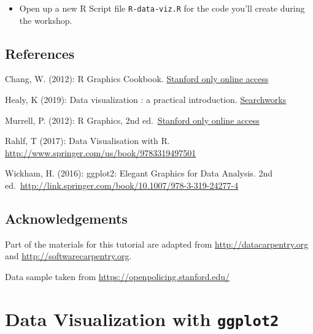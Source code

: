 \documentclass[]{book}
\providecommand{\tightlist}{%
  \setlength{\itemsep}{0pt}\setlength{\parskip}{0pt}}
\begin{document}
\begin{itemize}
\tightlist
\item
  Open up a new R Script file \texttt{R-data-viz.R} for the code you'll create during the workshop.
\end{itemize}

\hypertarget{references}{%
\section*{References}\label{references}}

Chang, W. (2012): R Graphics Cookbook. \href{https://stanford.idm.oclc.org/login?url=http://proquest.safaribooksonline.com/?uiCode=stanford\&xmlId=9781449363086}{Stanford only online access}

Healy, K (2019): Data visualization : a practical introduction. \href{https://searchworks.stanford.edu/view/12684817}{Searchworks}

Murrell, P. (2012): R Graphics, 2nd ed.~\href{https://stanford.idm.oclc.org/login?url=http://proquest.safaribooksonline.com/?uiCode=stanford\&xmlId=9781439831779}{Stanford only online access}

Rahlf, T (2017): Data Visualisation with R. \url{http://www.springer.com/us/book/9783319497501}

Wickham, H. (2016): ggplot2: Elegant Graphics for Data Analysis. 2nd ed.~\url{http://link.springer.com/book/10.1007/978-3-319-24277-4}

\hypertarget{acknowledgements}{%
\section*{Acknowledgements}\label{acknowledgements}}

Part of the materials for this tutorial are adapted from \url{http://datacarpentry.org} and \url{http://softwarecarpentry.org}.

Data sample taken from \url{https://openpolicing.stanford.edu/}

\hypertarget{data-visualization-with-ggplot2}{%
\chapter{\texorpdfstring{Data Visualization with \texttt{ggplot2}}{Data Visualization with ggplot2}}\label{data-visualization-with-ggplot2}}
\end{document}
